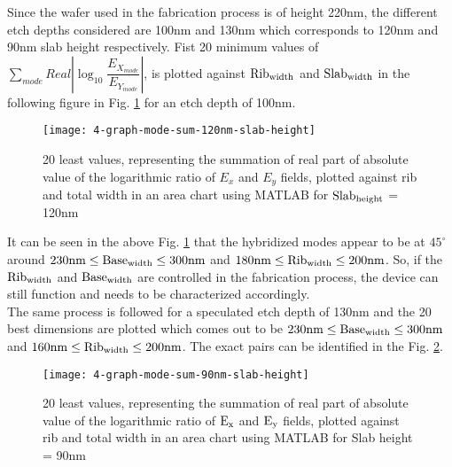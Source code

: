 \documentclass[../report.tex]{subfiles}
\begin{document}
Since the wafer used in the fabrication process is of height 220nm, the different etch depths considered are 100nm and 130nm which corresponds to 120nm and 90nm slab height respectively. Fist 20 minimum values of $\sum _{mode}Real\left| \log _{10}\dfrac {E_{X_{mode}}} {E_{Y_{mode}}}\right|$, is plotted against $\mathrm{Rib_{width}}$ and $\mathrm{Slab_{width}}$ in the following figure in Fig. \ref{fig:4_graph_mode_sum_120nm_slab_height} for an etch depth of 100nm. 

\begin{figure}[H] %
	\centering
	\texttt{[image: 4-graph-mode-sum-120nm-slab-height]}
	\caption{20 least values, representing the summation of real part of absolute value of the logarithmic ratio of $E_x$ and $E_y$ fields, plotted against rib and total width in an area chart using MATLAB for $\mathrm{Slab_{height}}$ = 120nm}
	\label{fig:4_graph_mode_sum_120nm_slab_height}
\end{figure}
\noindent It can be seen in the above Fig. \ref{fig:4_graph_mode_sum_120nm_slab_height} that the hybridized modes appear to be at $45^{\circ}$ around $\mathrm{230nm \leq Base_{width} \leq 300nm}$ and $\mathrm{180nm \leq Rib_{width} \leq 200nm}$. So, if the $\mathrm{Rib_{width}}$ and $\mathrm{Base_{width}}$ are controlled in the fabrication process, the device can still function and needs to be characterized accordingly.\\

The same process is followed for a speculated etch depth of 130nm and the 20 best dimensions are plotted which comes out to be $\mathrm{230nm \leq Base_{width} \leq 300nm}$ and $\mathrm{160nm \leq Rib_{width} \leq 200nm}$. The exact pairs can be identified in the Fig. \ref{fig:4_graph_mode_sum_90nm_slab_height}.
\begin{figure}[H] %
	\centering
	\texttt{[image: 4-graph-mode-sum-90nm-slab-height]}
	\caption{20 least values, representing the summation of real part of absolute value of the logarithmic ratio of $\mathrm{E_x}$ and $\mathrm{E_y}$ fields, plotted against rib and total width in an area chart using MATLAB for Slab height = 90nm}
	\label{fig:4_graph_mode_sum_90nm_slab_height}
\end{figure}
\end{document}
